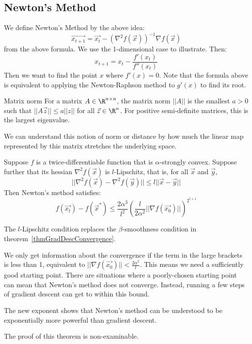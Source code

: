 \documentclass[../Main.tex]{subfiles}
\begin{document}
\subsection{Newton's Method}
We define Newton's Method by the above idea:
\begin{equation*}
    \vec{x_{t+1}} = \vec{x_t} - \left(\nabla^2 f(\vec{x})\right)^{-1} \nabla f(\vec{x})
\end{equation*}
from the above formula. We use the 1-dimensional case to illustrate. Then:
\begin{equation*}
    x_{t+1} = x_t - \frac{f'(x_t)}{f''(x_t)}
\end{equation*}
Then we want to find the point $x$ where $f'(x) = 0$. Note that the formula above is equivalent to applying the Newton-Raphson method to $g'(x)$ to find its root.
\begin{definition}{Matrix norm}
    For a matrix $A \in \R^{n \times n}$, the matrix norm $||A||$ is the smallest $a > 0$ such that $||A\vec{z}|| \leq a ||z||$ for all $\vec{z} \in \R^n$. For positive semi-definite matrices, this is the largest eigenvalue.
\end{definition}
\begin{remark}
    We can understand this notion of norm or distance by how much the linear map represented by this matrix stretches the underlying space.
\end{remark}
\begin{theorem}
    Suppose $f$ is a twice-differentiable function that is $\alpha$-strongly convex. Suppose further that its hessian $\nabla^2 f(\vec{x})$ is $l$-Lipschitz, that is, for all $\vec{x}$ and $\vec{y}$,
    \begin{equation*}
        ||\nabla^2 f(\vec{x}) - \nabla^2 f(\vec{y})|| \leq l||\vec{x} - \vec{y}||
    \end{equation*}
    Then Newton's method satisfies:
    \begin{equation*}
        f(\vec{x_t}) - f(\vec{x}^*) \leq \frac{2\alpha^3}{l^2} \left(\frac{l}{2\alpha^2} ||\nabla f(\vec{x_0})||\right)^{2^{t+1}}
    \end{equation*}
\end{theorem}
\begin{remarks}
    \item The $l$-Lipschitz condition replaces the $\beta$-smoothness condition in theorem~\ref{thmGradDescConvergence}.
    \item We only get information about the convergence if the term in the large brackets is less than 1, equivalent to $||\nabla f(\vec{x_0})|| < \frac{2\alpha^2}{l}$. This means we need a sufficiently good starting point. There are situations where a poorly-chosen starting point can mean that Newton's method does not converge. Instead, running a few steps of gradient descent can get to within this bound.
    \item The new exponent shows that Newton's method can be understood to be exponentially more powerful than gradient descent.
    \item The proof of this theorem is non-examinable.
\end{remarks}
\end{document}
